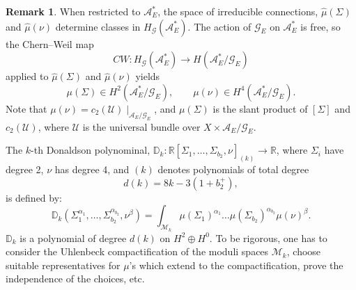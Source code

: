 \documentclass[a4paper,12pt,reqno,sumlimits]{amsart}
\theoremstyle{plain}
\theoremstyle{definition}
\newtheorem{rem}[thm]{Remark}
\newcommand{\R}{{\mathbb R}}
\newcommand{\D}{{\mathbb D}}
\newcommand{\1}{{\bf 1}}
\newcommand{\calA}{{\mathcal A}}
\newcommand{\calG}{{\mathcal G}}
\newcommand{\calM}{{\mathcal M}}
\newcommand{\calU}{{\mathcal U}}
\renewcommand{\to}{\longrightarrow}
\numberwithin{equation}{section}
\begin{document}
\begin{rem}
  When restricted to $\calA^*_E$, the space of irreducible connections, 
  $\hat{\mu}(\Sigma)$ and $\hat{\mu}(\nu)$ determine classes in
  $H_\calG(\calA^*_E)$. The action of $\calG_E$ on $\calA^*_E$ is free,
  so the Chern--Weil map
  $$
  CW:H_\calG(\calA^*_E)\to H(\calA^*_E/\calG_E)
  $$
  applied to $\hat{\mu}(\Sigma)$ and $\hat{\mu}(\nu)$ yields
  $$
  \mu(\Sigma)\in H^2(\calA^*_E/\calG_E),\qquad\mu(\nu)\in H^4(\calA^*_E/\calG_E).
  $$
  Note that $\mu(\nu)=c_2(\calU)\!\mid_{\calA_E/\calG_E}$, and
  $\mu(\Sigma)$ is the slant product of $[\Sigma]$ and $c_2(\calU)$, where
  $\calU$ is the universal bundle over $X\times\calA_E/\calG_E$.
\end{rem}

The $k$-th Donaldson polynominal,
$\D_k:\R[\Sigma_1,\dots,\Sigma_{b_2},\nu]_{(k)}\to\R$, where $\Sigma_i$ have
degree 2, $\nu$ has degree 4, and $(k)$ denotes polynomials of total degree
$$
d(k)=8k-3(1+b_2^+),
$$
is defined by:
\begin{equation}
  \label{donaldson_k}
  \D_k(\Sigma_1^{\alpha_1},\dots,\Sigma_{b_2}^{\alpha_{b_2}},\nu^\beta)
  =\int_{\calM_k}\mu(\Sigma_1)^{\alpha_1}\dots
  \mu(\Sigma_{b_2})^{\alpha_{b_2}}\mu(\nu)^\beta.
\end{equation}
$\D_k$ is a polynomial of degree $d(k)$ on $H^2\oplus H^0$.  To be rigorous,
one has to consider the Uhlenbeck compactification of the moduli spaces
$\calM_k$, choose suitable representatives for $\mu$'s which extend to the
compactification, prove the independence of the choices, etc.
\end{document}
